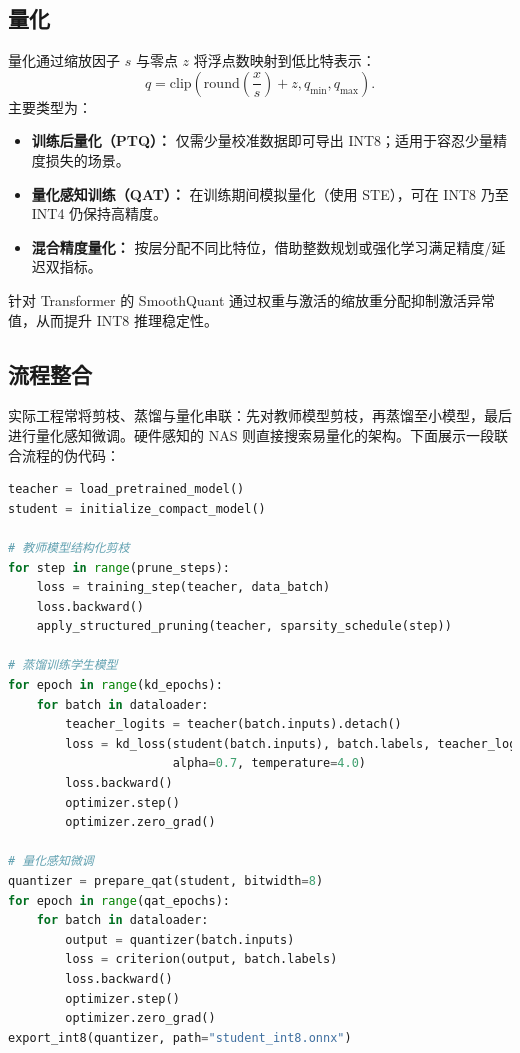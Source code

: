 \documentclass[UTF8,zihao=-4]{ctexart}
\begin{document}
\subsection{量化}
量化通过缩放因子 $s$ 与零点 $z$ 将浮点数映射到低比特表示：
\begin{equation}
  q = \mathrm{clip}\left(\mathrm{round}\left(\frac{x}{s}\right) + z, q_{\min}, q_{\max}\right).
\end{equation}
主要类型为：
\begin{itemize}
  \item \textbf{训练后量化（PTQ）：} 仅需少量校准数据即可导出 INT8；适用于容忍少量精度损失的场景。
  \item \textbf{量化感知训练（QAT）：} 在训练期间模拟量化（使用 STE），可在 INT8 乃至 INT4 仍保持高精度。
  \item \textbf{混合精度量化：} 按层分配不同比特位，借助整数规划或强化学习满足精度/延迟双指标。
\end{itemize}
针对 Transformer 的 SmoothQuant 通过权重与激活的缩放重分配抑制激活异常值，从而提升 INT8 推理稳定性。

\subsection{流程整合}
实际工程常将剪枝、蒸馏与量化串联：先对教师模型剪枝，再蒸馏至小模型，最后进行量化感知微调。硬件感知的 NAS 则直接搜索易量化的架构。下面展示一段联合流程的伪代码：

\begin{lstlisting}[language=Python, caption={剪枝 + 蒸馏 + 量化感知训练联合流程示例。}]
teacher = load_pretrained_model()
student = initialize_compact_model()

# 教师模型结构化剪枝
for step in range(prune_steps):
    loss = training_step(teacher, data_batch)
    loss.backward()
    apply_structured_pruning(teacher, sparsity_schedule(step))

# 蒸馏训练学生模型
for epoch in range(kd_epochs):
    for batch in dataloader:
        teacher_logits = teacher(batch.inputs).detach()
        loss = kd_loss(student(batch.inputs), batch.labels, teacher_logits,
                       alpha=0.7, temperature=4.0)
        loss.backward()
        optimizer.step()
        optimizer.zero_grad()

# 量化感知微调
quantizer = prepare_qat(student, bitwidth=8)
for epoch in range(qat_epochs):
    for batch in dataloader:
        output = quantizer(batch.inputs)
        loss = criterion(output, batch.labels)
        loss.backward()
        optimizer.step()
        optimizer.zero_grad()
export_int8(quantizer, path="student_int8.onnx")
\end{lstlisting}
\end{document}
